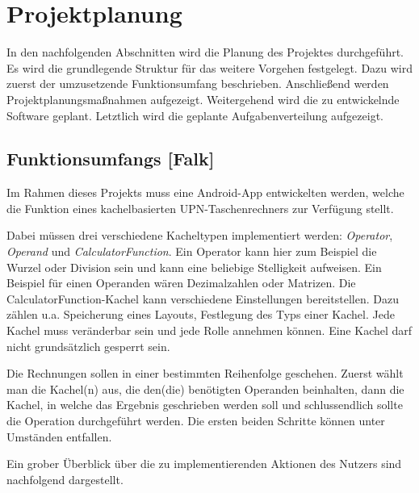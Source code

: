 \section{Projektplanung}

In den nachfolgenden Abschnitten wird die Planung des Projektes durchgeführt. Es wird die grundlegende Struktur für das weitere Vorgehen festgelegt. Dazu wird zuerst der umzusetzende Funktionsumfang beschrieben. Anschließend werden Projektplanungsmaßnahmen aufgezeigt. Weitergehend wird die zu entwickelnde Software geplant. Letztlich wird die geplante Aufgabenverteilung aufgezeigt.

\subsection{Funktionsumfangs [Falk]}

Im Rahmen dieses Projekts muss eine Android-App entwickelten werden, welche die Funktion eines kachelbasierten UPN-Taschenrechners zur Verfügung stellt. 

Dabei müssen drei verschiedene Kacheltypen implementiert werden: \textit{Operator}, \textit{Operand} und \textit{CalculatorFunction}. Ein Operator kann hier zum Beispiel die Wurzel oder Division sein und kann eine beliebige Stelligkeit aufweisen. Ein Beispiel für einen Operanden wären Dezimalzahlen oder Matrizen. Die CalculatorFunction-Kachel kann verschiedene Einstellungen bereitstellen. Dazu zählen u.a. Speicherung eines Layouts, Festlegung des Typs einer Kachel. Jede Kachel muss veränderbar sein und jede Rolle annehmen können. Eine Kachel darf nicht grundsätzlich gesperrt sein. 

Die Rechnungen sollen in einer bestimmten Reihenfolge geschehen. Zuerst wählt man die Kachel(n) aus, die den(die) benötigten Operanden beinhalten, dann die Kachel, in welche das Ergebnis geschrieben werden soll und schlussendlich sollte die Operation durchgeführt werden. Die ersten beiden Schritte können unter Umständen entfallen. 

Ein grober Überblick über die zu implementierenden Aktionen des Nutzers sind  nachfolgend dargestellt.


